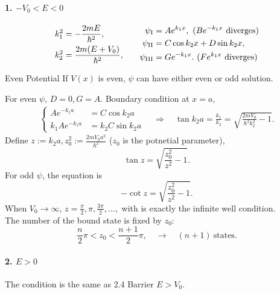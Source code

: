 \documentclass{article}
\begin{document}
\paragraph{1. $-V_0<E<0$}
\begin{align*}
	\begin{aligned}
		k_1^2 & =-\frac{2mE}{\hbar^2},      \\
		k_2^2 & =\frac{2m(E+V_0)}{\hbar^2},
	\end{aligned}\qquad
	\begin{aligned}
		\psi_{\rm I}   & =Ae^{k_1x},~(Be^{-k_1x}~{\rm diverges}) \\
		\psi_{\rm II}  & =C\cos{k_2x}+D\sin{k_2x},               \\
		\psi_{\rm III} & =Ge^{-k_1x}.~(Fe^{k_1x}~{\rm diverges})
	\end{aligned}
\end{align*}
\begin{theorem}{Even Potential}{}
	If $V(x)$ is even, $\psi$ can have either even or odd solution.
\end{theorem}
For even $\psi$, $D=0,G=A$. Boundary condition at $x=a$,
\begin{align*}
	\left\{
	\begin{aligned}
		Ae^{-k_1a}    & =C\cos k_2a    \\
		k_1Ae^{-k_1a} & =k_2C\sin k_2a
	\end{aligned}\right.
	\quad\Rightarrow\quad
	\tan k_2a=\frac{k_1}{k_2}=\sqrt{\frac{2mV_0}{\hbar^2k_2^2}-1}.
\end{align*}
Define $z:=k_2a,z_0^2:=\frac{2mV_0a^2}{\hbar^2}$ ($z_0$ is the potnetial parameter),
$$\tan z=\sqrt{\frac{z_0^2}{z^2}-1}.$$
For odd $\psi$, the equation is
$$-\cot z=\sqrt{\frac{z_0^2}{z^2}-1}.$$
When $V_0\to\infty$, $z=\frac\pi{2},\pi,\frac{3\pi}2,\ldots,$ with is exactly the infinite well condition.\\
The number of the bound state is fixed by $z_0$:
$$\frac n2\pi<z_0<\frac{n+1}2\pi,\quad\rightarrow\quad(n+1)~\text{states.}$$
\paragraph{2. $E>0$}The condition is the same as 2.4 Barrier $E>V_0$.
\clearpage
\end{document}
